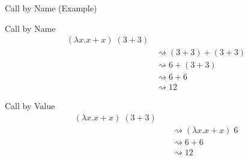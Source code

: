 \documentclass[10pt]{beamer}
\newcommand{\lam}[2]{\lambda #1 . #2}
\newcommand{\app}[2]{#1 \; #2}
\begin{document}
\begin{frame}[fragile]{Call by Name (Example)}
  \begin{exampleblock}{Call by Name}
    \begin{align*}
      \app{(\lam{x}{x+x})}{(3+3)}       \\
       & \rightsquigarrow (3+3) + (3+3) \\
       & \rightsquigarrow 6 + (3+3)     \\
       & \rightsquigarrow 6 + 6         \\
       & \rightsquigarrow 12
    \end{align*}

    \pause

  \end{exampleblock}

  \begin{exampleblock}{Call by Value}
    \begin{align*}
      \app{(\lam{x}{x+x})}{(3+3)}                       \\
       & \quad \rightsquigarrow \app{(\lam{x}{x+x})}{6} \\
       & \quad \rightsquigarrow 6 + 6                   \\
       & \quad \rightsquigarrow 12
    \end{align*}
  \end{exampleblock}

\end{frame}
\end{document}

